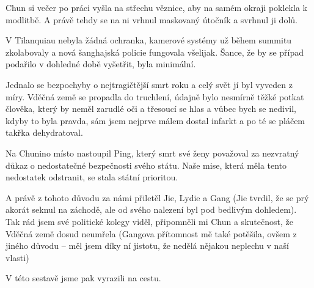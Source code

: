 Chun si večer po práci vyšla na střechu věznice, aby na samém okraji poklekla k modlitbě. A právě tehdy se na ni vrhnul maskovaný útočník a svrhnul ji dolů.

V Tilanquiau nebyla žádná ochranka, kamerové systémy už během summitu zkolabovaly a nová šanghajská policie fungovala všelijak. Šance, že by se případ podařilo v dohledné době vyšetřit, byla minimální.

Jednalo se bezpochyby o nejtragičtější smrt roku a celý svět jí byl vyveden z míry. Vděčná země se propadla do truchlení, údajně bylo nesmírně těžké potkat člověka, který by neměl zarudlé oči a třesoucí se hlas a vůbec bych se nedivil, kdyby to byla pravda, sám jsem nejprve málem dostal infarkt a po té se pláčem takřka dehydratoval.

Na Chunino místo nastoupil Ping, který smrt své ženy považoval za nezvratný důkaz o nedostatečné bezpečnosti svého státu. Naše mise, která měla tento nedostatek odstranit, se stala státní prioritou.

A právě z tohoto důvodu za námi přiletěl Jie, Lydie a Gang (Jie tvrdil, že se prý akorát seknul na záchodě, ale od svého nalezení byl pod bedlivým dohledem). Tak rád jsem své politické kolegy viděl, připomněli mi Chun a skutečnost, že Vděčná země dosud neumřela (Gangova přítomnost mě také potěšila, ovšem z jiného důvodu – měl jsem díky ní jistotu, že nedělá nějakou neplechu v naší vlasti)

V této sestavě jsme pak vyrazili na cestu.
